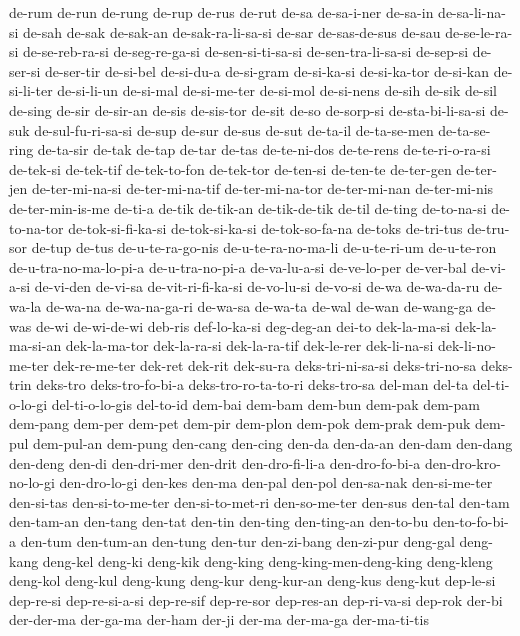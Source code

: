{de-rum de-run de-rung de-rup de-rus de-rut de-sa de-sa-i-ner de-sa-in
de-sa-li-na-si de-sah de-sak de-sak-an de-sak-ra-li-sa-si de-sar
de-sas-de-sus de-sau de-se-le-ra-si de-se-reb-ra-si de-seg-re-ga-si
de-sen-si-ti-sa-si de-sen-tra-li-sa-si de-sep-si de-ser-si de-ser-tir
de-si-bel de-si-du-a de-si-gram de-si-ka-si de-si-ka-tor de-si-kan
de-si-li-ter de-si-li-un de-si-mal de-si-me-ter de-si-mol de-si-nens
de-sih de-sik de-sil de-sing de-sir de-sir-an de-sis de-sis-tor de-sit
de-so de-sorp-si de-sta-bi-li-sa-si de-suk de-sul-fu-ri-sa-si de-sup
de-sur de-sus de-sut de-ta-il de-ta-se-men de-ta-se-ring de-ta-sir de-tak
de-tap de-tar de-tas de-te-ni-dos de-te-rens de-te-ri-o-ra-si de-tek-si
de-tek-tif de-tek-to-fon de-tek-tor de-ten-si de-ten-te de-ter-gen
de-ter-jen de-ter-mi-na-si de-ter-mi-na-tif de-ter-mi-na-tor de-ter-mi-nan
de-ter-mi-nis de-ter-min-is-me de-ti-a de-tik de-tik-an de-tik-de-tik
de-til de-ting de-to-na-si de-to-na-tor de-tok-si-fi-ka-si de-tok-si-ka-si
de-tok-so-fa-na de-toks de-tri-tus de-tru-sor de-tup de-tus
de-u-te-ra-go-nis de-u-te-ra-no-ma-li de-u-te-ri-um de-u-te-ron
de-u-tra-no-ma-lo-pi-a de-u-tra-no-pi-a de-va-lu-a-si de-ve-lo-per
de-ver-bal de-vi-a-si de-vi-den de-vi-sa de-vit-ri-fi-ka-si de-vo-lu-si
de-vo-si de-wa de-wa-da-ru de-wa-la de-wa-na de-wa-na-ga-ri de-wa-sa
de-wa-ta de-wal de-wan de-wang-ga de-was de-wi de-wi-de-wi deb-ris
def-lo-ka-si deg-deg-an dei-to dek-la-ma-si dek-la-ma-si-an dek-la-ma-tor
dek-la-ra-si dek-la-ra-tif dek-le-rer dek-li-na-si dek-li-no-me-ter
dek-re-me-ter dek-ret dek-rit dek-su-ra deks-tri-ni-sa-si deks-tri-no-sa
deks-trin deks-tro deks-tro-fo-bi-a deks-tro-ro-ta-to-ri deks-tro-sa
del-man del-ta del-ti-o-lo-gi del-ti-o-lo-gis del-to-id dem-bai dem-bam
dem-bun dem-pak dem-pam dem-pang dem-per dem-pet dem-pir dem-plon dem-pok
dem-prak dem-puk dem-pul dem-pul-an dem-pung den-cang den-cing den-da
den-da-an den-dam den-dang den-deng den-di den-dri-mer den-drit
den-dro-fi-li-a den-dro-fo-bi-a den-dro-kro-no-lo-gi den-dro-lo-gi den-kes
den-ma den-pal den-pol den-sa-nak den-si-me-ter den-si-tas
den-si-to-me-ter den-si-to-met-ri den-so-me-ter den-sus den-tal den-tam
den-tam-an den-tang den-tat den-tin den-ting den-ting-an den-to-bu
den-to-fo-bi-a den-tum den-tum-an den-tung den-tur den-zi-bang den-zi-pur
deng-gal deng-kang deng-kel deng-ki deng-kik deng-king
deng-king-men-deng-king deng-kleng deng-kol deng-kul deng-kung deng-kur
deng-kur-an deng-kus deng-kut dep-le-si dep-re-si dep-re-si-a-si
dep-re-sif dep-re-sor dep-res-an dep-ri-va-si dep-rok der-bi der-der-ma
der-ga-ma der-ham der-ji der-ma der-ma-ga der-ma-ti-tis
}
